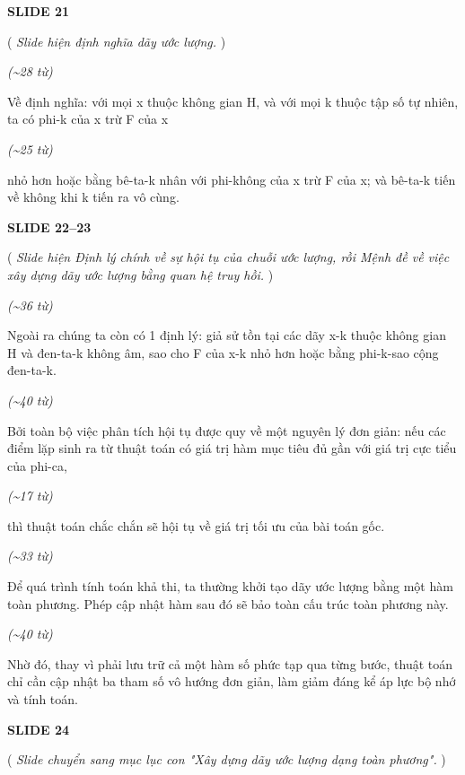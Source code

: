 ﻿\documentclass[12pt]{article}
\newcommand{\scene}[1]{
    \vspace{18pt}
    \normalsize
    \noindent\textbf{\MakeUppercase{#1}}
    \vspace{12pt}
}
\newcommand{\action}[1]{
    \vspace{6pt}
    \small
    \noindent(\textit{#1})
    \vspace{6pt}
}
\newenvironment{speech}{
    \normalsize
    \begin{list}{}{
        \leftmargin=1.25in
        \rightmargin=1.25in
        \parsep=0pt
        \topsep=0pt
        \partopsep=0pt
    }
    \item[]
}{
    \end{list}
    \vspace{6pt}
}
\newcommand{\block}[1]{
    \vspace{4pt}
    \noindent\hspace{1.5in}\textit{(\textasciitilde #1 từ)}
}
\begin{document}
\scene{SLIDE 21}

\action{
    Slide hiện định nghĩa dãy ước lượng.
}

\block{28}
\begin{speech}
    Về định nghĩa: với mọi x thuộc không gian H, và với mọi k thuộc tập số tự nhiên, ta có phi-k của x trừ F của x
\end{speech}

\block{25}
\begin{speech}
    nhỏ hơn hoặc bằng bê-ta-k nhân với phi-không của x trừ F của x; và bê-ta-k tiến về không khi k tiến ra vô cùng.
\end{speech}

\scene{SLIDE 22--23}

\action{
    Slide hiện Định lý chính về sự hội tụ của chuỗi ước lượng, rồi Mệnh đề về việc xây dựng dãy ước lượng bằng quan hệ truy hồi.
}

\block{36}
\begin{speech}
    Ngoài ra chúng ta còn có 1 định lý: giả sử tồn tại các dãy x-k thuộc không gian H và đen-ta-k không âm, sao cho F của x-k nhỏ hơn hoặc bằng phi-k-sao cộng đen-ta-k.
\end{speech}

\block{40}
\begin{speech}
    Bởi toàn bộ việc phân tích hội tụ được quy về một nguyên lý đơn giản: nếu các điểm lặp sinh ra từ thuật toán có giá trị hàm mục tiêu đủ gần với giá trị cực tiểu của phi-ca,
\end{speech}

\block{17}
\begin{speech}
    thì thuật toán chắc chắn sẽ hội tụ về giá trị tối ưu của bài toán gốc.
\end{speech}

\block{33}
\begin{speech}
    Để quá trình tính toán khả thi, ta thường khởi tạo dãy ước lượng bằng một hàm toàn phương. Phép cập nhật hàm sau đó sẽ bảo toàn cấu trúc toàn phương này.
\end{speech}

\block{40}
\begin{speech}
    Nhờ đó, thay vì phải lưu trữ cả một hàm số phức tạp qua từng bước, thuật toán chỉ cần cập nhật ba tham số vô hướng đơn giản, làm giảm đáng kể áp lực bộ nhớ và tính toán.
\end{speech}

\scene{SLIDE 24}

\action{
    Slide chuyển sang mục lục con "Xây dựng dãy ước lượng dạng toàn phương".
}
\end{document}
